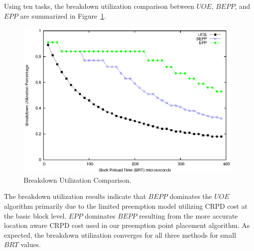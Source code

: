Using ten tasks, the breakdown utilization comparison between ${UOE}$, ${BEPP}$, and ${EPP}$ are summarized in Figure~\ref{fig:breakdown_utilization}.
\begin{figure}[h!]
\vspace{-10pt}
\begin{center}
\includegraphics[width=\linewidth]{eps/breakdown.eps}
\caption{Breakdown Utilization Comparison.}
\label{fig:breakdown_utilization}
\end{center}
\vspace{-10pt}
\end{figure}
The breakdown utilization results indicate that $BEPP$ dominates the $UOE$ algorithm primarily due to the limited preemption model utilizing CRPD cost at the basic block level.  $EPP$ dominates $BEPP$ resulting from the more accurate location aware CRPD cost used in our preemption point placement algorithm.  As expected, the breakdown utilization converges for all three methods for small ${BRT}$ values.
